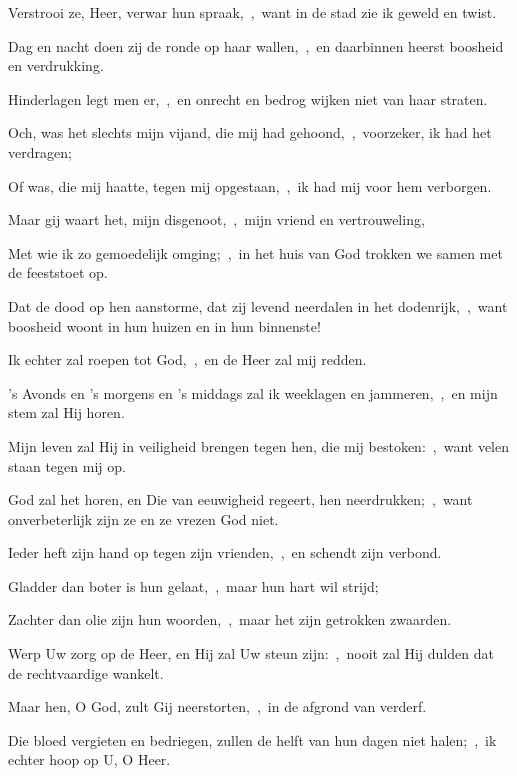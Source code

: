\documentclass[12pt,twoside,a5paper]{article}
\begin{document}

\begin{halfparskip}
  Verstrooi ze, Heer, verwar hun spraak,~\sep\ want in de stad zie ik geweld en twist.

  Dag en nacht doen zij de ronde op haar wallen,~\sep\ en daarbinnen heerst boosheid en verdrukking.

  Hinderlagen legt men er,~\sep\ en onrecht en bedrog wijken niet van haar straten.

  Och, was het slechts mijn vijand, die mij had gehoond,~\sep\ voorzeker, ik had het verdragen;

  Of was, die mij haatte, tegen mij opgestaan,~\sep\ ik had mij voor hem verborgen.

  Maar gij waart het, mijn disgenoot,~\sep\ mijn vriend en vertrouweling,

  Met wie ik zo gemoedelijk omging;~\sep\ in het huis van God trokken we samen met de feeststoet op.
\end{halfparskip}


\begin{halfparskip}
  Dat de dood op hen aanstorme, dat zij levend neerdalen in het dodenrijk,~\sep\ want boosheid woont in hun huizen en in hun binnenste!

  Ik echter zal roepen tot God,~\sep\ en de Heer zal mij redden.

  's Avonds en 's morgens en 's middags zal ik weeklagen en jammeren,~\sep\ en mijn stem zal Hij horen.

  Mijn leven zal Hij in veiligheid brengen tegen hen, die mij bestoken:~\sep\ want velen staan tegen mij op.

  God zal het horen, en Die van eeuwigheid regeert, hen neerdrukken;~\sep\ want onverbeterlijk zijn ze en ze vrezen God niet.

  Ieder heft zijn hand op tegen zijn vrienden,~\sep\ en schendt zijn verbond.

  Gladder dan boter is hun gelaat,~\sep\ maar hun hart wil strijd;

  Zachter dan olie zijn hun woorden,~\sep\ maar het zijn getrokken zwaarden.

  Werp Uw zorg op de Heer, en Hij zal Uw steun zijn:~\sep\ nooit zal Hij dulden dat de rechtvaardige wankelt.

  Maar hen, O God, zult Gij neerstorten,~\sep\ in de afgrond van verderf.

  Die bloed vergieten en bedriegen, zullen de helft van hun dagen niet halen;~\sep\ ik echter hoop op U, O Heer.
\end{halfparskip}
\end{document}
